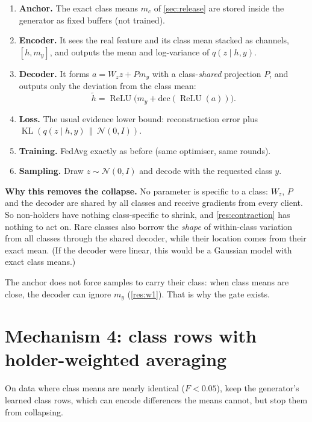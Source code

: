 \documentclass[11pt]{article}
\theoremstyle{plain}
\theoremstyle{definition}
\newcommand{\ReLU}{\operatorname{ReLU}}
\newcommand{\KL}{\operatorname{KL}}
\begin{document}
\begin{steps}
\begin{enumerate}
\item \textbf{Anchor.} The exact class means $m_c$ of \cref{sec:release} are stored inside the generator as fixed
buffers (not trained).
\item \textbf{Encoder.} It sees the real feature and its class mean stacked as channels, $[h,m_y]$, and outputs the
mean and log-variance of $q(z\mid h,y)$.
\item \textbf{Decoder.} It forms $a=W_zz+Pm_y$ with a class-\emph{shared} projection $P$, and outputs only the
deviation from the class mean:
\[
\tilde h=\ReLU\big(m_y+\mathrm{dec}(\ReLU(a))\big).
\]
\item \textbf{Loss.} The usual evidence lower bound: reconstruction error plus $\KL(q(z\mid h,y)\,\|\,\mathcal N(0,I))$.
\item \textbf{Training.} FedAvg exactly as before (same optimiser, same rounds).
\item \textbf{Sampling.} Draw $z\sim\mathcal N(0,I)$ and decode with the requested class $y$.
\end{enumerate}
\end{steps}

\textbf{Why this removes the collapse.} No parameter is specific to a class: $W_z$, $P$ and the decoder are shared by
all classes and receive gradients from every client. So non-holders have nothing class-specific to shrink, and
\cref{res:contraction} has nothing to act on. Rare classes also borrow the \emph{shape} of within-class variation from
all classes through the shared decoder, while their location comes from their exact mean. (If the decoder were
linear, this would be a Gaussian model with exact class means.)

\begin{caveat}
The anchor does not force samples to carry their class: when class means are close, the decoder can ignore $m_y$
(\cref{res:w1}). That is why the gate exists.
\end{caveat}

\section{Mechanism 4: class rows with holder-weighted averaging}\label{sec:hwa}

\begin{purpose}
On data where class means are nearly identical ($F<0.05$), keep the generator's learned class rows, which can encode
differences the means cannot, but stop them from collapsing.
\end{purpose}
\end{document}
